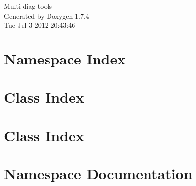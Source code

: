 \documentclass[a4paper]{book}
\begin{document}
\hypersetup{pageanchor=false}
\begin{titlepage}
\vspace*{7cm}
\begin{center}
{\Large Multi diag tools }\\
\vspace*{1cm}
{\large Generated by Doxygen 1.7.4}\\
\vspace*{0.5cm}
{\small Tue Jul 3 2012 20:43:46}\\
\end{center}
\end{titlepage}
\clearemptydoublepage
{}
\tableofcontents
\clearemptydoublepage
{}
\hypersetup{pageanchor=true}
\chapter{Namespace Index}

\chapter{Class Index}

\chapter{Class Index}

\chapter{Namespace Documentation}

\end{document}

